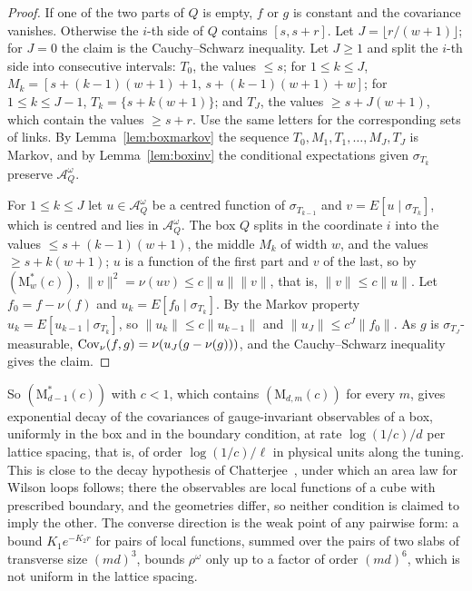 \begin{proof}
If one of the two parts of $Q$ is empty, $f$ or $g$ is constant and the
covariance vanishes. Otherwise the $i$-th side of $Q$ contains $[s,s+r]$.
Let $J=\lfloor r/(w+1)\rfloor$; for $J=0$ the claim is the Cauchy--Schwarz
inequality. Let $J\ge1$ and split the $i$-th side into consecutive
intervals: $T_0$, the values $\le s$; for $1\le k\le J$, $M_k=[s+(k-1)(w+1)+
1,\,s+(k-1)(w+1)+w]$; for $1\le k\le J-1$, $T_k=\{s+k(w+1)\}$; and $T_J$, the
values $\ge s+J(w+1)$, which contain the values $\ge s+r$. Use the same
letters for the corresponding sets of links. By Lemma~\ref{lem:boxmarkov}
the sequence $T_0,M_1,T_1,\dots,M_J,T_J$ is Markov, and by
Lemma~\ref{lem:boxinv} the conditional expectations given $\sigma_{T_k}$
preserve $\mathcal A^\omega_Q$.

For $1\le k\le J$ let $u\in\mathcal A^\omega_Q$ be a centred function of
$\sigma_{T_{k-1}}$ and $v=E[u\mid\sigma_{T_k}]$, which is centred and lies
in $\mathcal A^\omega_Q$. The box $Q$ splits in the coordinate $i$ into the
values $\le s+(k-1)(w+1)$, the middle $M_k$ of width $w$, and the values
$\ge s+k(w+1)$; $u$ is a function of the first part and $v$ of the last, so
by $(\mathrm M^*_w(c))$, $\|v\|^2=\nu(uv)\le c\|u\|\|v\|$, that is,
$\|v\|\le c\|u\|$. Let $f_0=f-\nu(f)$ and $u_k=E[f_0\mid\sigma_{T_k}]$. By
the Markov property $u_k=E[u_{k-1}\mid\sigma_{T_k}]$, so $\|u_k\|\le
c\|u_{k-1}\|$ and $\|u_J\|\le c^J\|f_0\|$. As $g$ is
$\sigma_{T_J}$-measurable, $\operatorname{Cov}_\nu(f,g)=\nu(u_J(g-\nu(g)))$, and the
Cauchy--Schwarz inequality gives the claim.
\end{proof}

So $(\mathrm M^*_{d-1}(c))$ with $c<1$, which contains $(\mathrm
M_{d,m}(c))$ for every $m$, gives exponential decay of the covariances of
gauge-invariant observables of a box, uniformly in the box and in the
boundary condition, at rate $\log(1/c)/d$ per lattice spacing, that is, of
order $\log(1/c)/\ell$ in physical units along the tuning. This is close to
the decay hypothesis of Chatterjee~\cite[Def.~2.3]{Cha21}, under which an
area law for Wilson loops follows; there the observables are local
functions of a cube with prescribed boundary, and the geometries differ, so
neither condition is claimed to imply the other. The converse direction is
the weak point of any pairwise form: a bound $K_1e^{-K_2r}$ for pairs of
local functions, summed over the pairs of two slabs of transverse size
$(md)^3$, bounds $\rho^\omega$ only up to a factor of order $(md)^6$, which
is not uniform in the lattice spacing.

